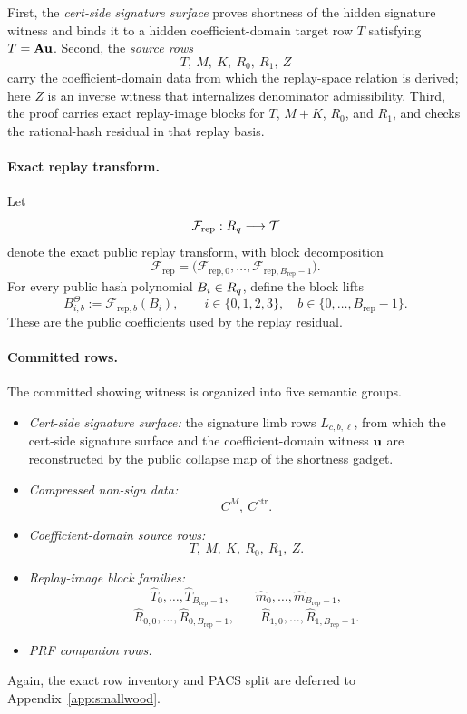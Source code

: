 First, the \emph{cert-side signature surface} proves shortness of the hidden signature witness and binds it to a hidden
coefficient-domain target row \(T\) satisfying \(T=\mathbf{A}\mathbf{u}\). Second, the \emph{source rows}
\[
T,\ M,\ K,\ R_0,\ R_1,\ Z
\]
carry the coefficient-domain data from which the replay-space relation is derived; here \(Z\) is an inverse witness that
internalizes denominator admissibility. Third, the proof carries exact replay-image blocks for \(T\), \(M+K\),
\(R_0\), and \(R_1\), and checks the rational-hash residual in that replay basis.

\paragraph{Exact replay transform.}
Let
\[
\mathcal F_{\mathrm{rep}} : R_q \longrightarrow \mathcal T
\]
denote the exact public replay transform, with block decomposition
\[
\mathcal F_{\mathrm{rep}} = \bigl(\mathcal F_{\mathrm{rep},0},\ldots,\mathcal F_{\mathrm{rep},B_{\mathrm{rep}}-1}\bigr).
\]
For every public hash polynomial \(B_i\in R_q\), define the block lifts
\[
B_{i,b}^\Theta := \mathcal F_{\mathrm{rep},b}(B_i),
\qquad i\in\{0,1,2,3\},\quad b\in\{0,\ldots,B_{\mathrm{rep}}-1\}.
\]
These are the public coefficients used by the replay residual.

\paragraph{Committed rows.}
The committed showing witness is organized into five semantic groups.
\begin{itemize}[leftmargin=1.25em]
    \item \emph{Cert-side signature surface:} the signature limb rows \(L_{c,b,\ell}\), from which the cert-side
    signature surface and the coefficient-domain witness \(\mathbf{u}\) are reconstructed by the public collapse map of the
    shortness gadget.
    \item \emph{Compressed non-sign data:}
    \[
    C^M,\ C^{\mathrm{ctr}}.
    \]
    \item \emph{Coefficient-domain source rows:}
    \[
    T,\ M,\ K,\ R_0,\ R_1,\ Z.
    \]
    \item \emph{Replay-image block families:}
    \[
    \widehat T_0,\ldots,\widehat T_{B_{\mathrm{rep}}-1},
    \qquad
    \widehat m_0,\ldots,\widehat m_{B_{\mathrm{rep}}-1},
    \]
    \[
    \widehat R_{0,0},\ldots,\widehat R_{0,B_{\mathrm{rep}}-1},
    \qquad
    \widehat R_{1,0},\ldots,\widehat R_{1,B_{\mathrm{rep}}-1}.
    \]
    \item \emph{PRF companion rows.}
\end{itemize}
Again, the exact row inventory and PACS split are deferred to Appendix~\ref{app:smallwood}.

